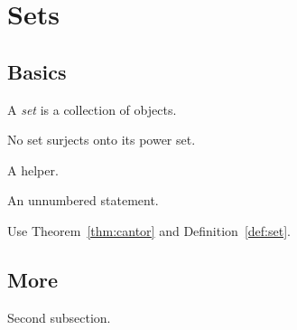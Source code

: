 \documentclass[11pt]{scrartcl}
\begin{document}
\section{Sets}
\subsection{Basics}
\begin{definition}\label{def:set}
A \emph{set} is a collection of objects.
\end{definition}
\begin{theorem}[Cantor]\label{thm:cantor}
No set surjects onto its power set.
\end{theorem}
\begin{lemma} A helper. \end{lemma}
\begin{theorem*} An unnumbered statement. \end{theorem*}
\begin{problem}[5 points]\label{prob:one}
Use Theorem~\ref{thm:cantor} and Definition~\ref{def:set}.
\end{problem}

\subsection{More}
\begin{problem} Second subsection. \end{problem}
\end{document}
